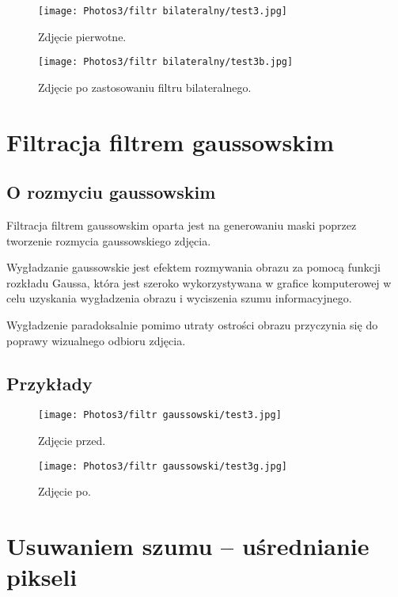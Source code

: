 \documentclass[]{mwart}
\begin{document}
\begin{figure}[H]
    \centering
    \texttt{[image: Photos3/filtr bilateralny/test3.jpg]}
    \caption{Zdjęcie pierwotne.}
\end{figure} \newpage
\begin{figure}[H]
    \centering
    \texttt{[image: Photos3/filtr bilateralny/test3b.jpg]}
    \caption{Zdjęcie po zastosowaniu filtru bilateralnego.}
\end{figure}






\section{Filtracja filtrem gaussowskim           }
\subsection{O rozmyciu gaussowskim}
Filtracja filtrem gaussowskim oparta jest na generowaniu maski poprzez tworzenie rozmycia gaussowskiego zdjęcia.

Wygładzanie gaussowskie jest efektem rozmywania obrazu za pomocą funkcji rozkładu Gaussa,
która jest szeroko wykorzystywana w grafice komputerowej w celu uzyskania wygładzenia obrazu i wyciszenia szumu informacyjnego.

Wygładzenie paradoksalnie pomimo utraty ostrości obrazu przyczynia się do poprawy wizualnego odbioru zdjęcia.

\subsection{Przykłady}

\begin{figure}[H]
    \centering
    \texttt{[image: Photos3/filtr gaussowski/test3.jpg]}
    \caption{Zdjęcie przed.}
\end{figure} \newpage
\begin{figure}[H]
    \centering
    \texttt{[image: Photos3/filtr gaussowski/test3g.jpg]}
    \caption{Zdjęcie po.}
\end{figure}





\vfill
\section{Usuwaniem szumu -- uśrednianie pikseli}
\end{document}
